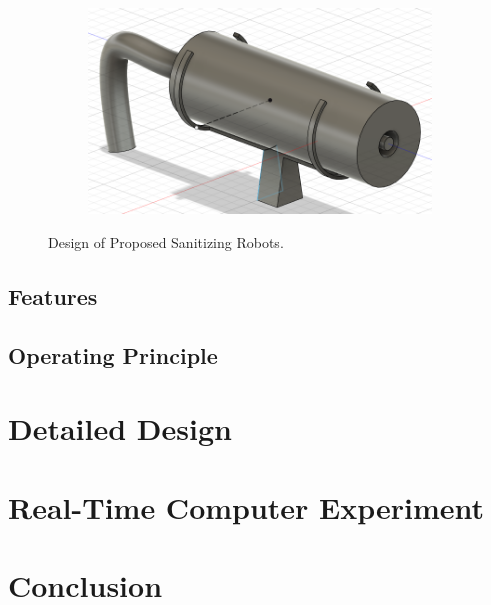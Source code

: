\documentclass[letterpaper]{article} %
\begin{document}
\begin{figure}[htpb]
\begin{subfigure}[b]{.5\textwidth}
  \end{subfigure}
  \begin{subfigure}[b]{.5\textwidth}
    \centering
    \includegraphics[scale=0.1]{../figs/img/v2SprayerMount}
  \end{subfigure}
  \caption{Design of Proposed Sanitizing Robots.}
  \label{fig:ArchitecturesOfSanitizingRobot}
\end{figure}


\subsection{Features}
\label{sec:Features}

\subsection{Operating Principle}
\label{sec:OperatingPrinciple}



\section{Detailed Design}
\label{sec:DetailedDesign}



\section{Real-Time Computer Experiment}
\label{sec:RealTimeComputerExperiment}


\section{Conclusion} \label{sec:conclusion}


% 
% 
\end{document}
